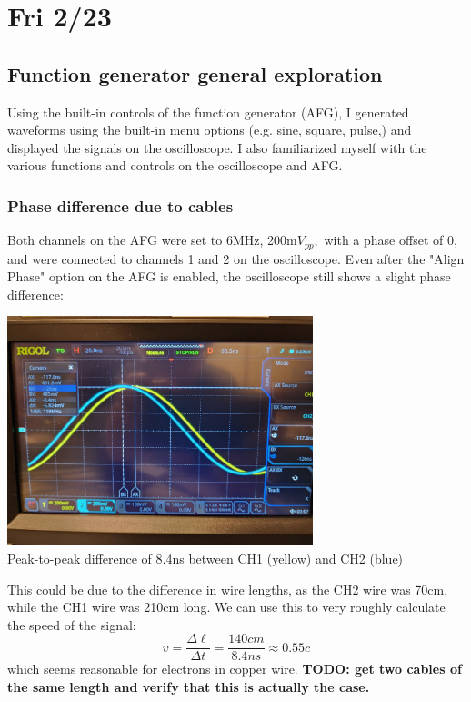 \documentclass{article}
\begin{document}
    \section*{Fri 2/23}
    \subsection*{Function generator general exploration}
    Using the built-in controls of the function generator (AFG), I generated waveforms using the built-in menu options (e.g. sine, square, pulse,) and displayed the signals on the oscilloscope. I also familiarized myself with the various functions and controls on the oscilloscope and AFG.
    \subsubsection*{Phase difference due to cables}
    Both channels on the AFG were set to 6MHz, 200m$V_{pp},$ with a phase offset of $0,$ and were connected to channels 1 and 2 on the oscilloscope. Even after the "Align Phase" option on the AFG is enabled, the oscilloscope still shows a slight phase difference: 
    \begin{mdframed}[backgroundcolor=gray!20, align = center, userdefinedwidth = 3.8in]
    \includegraphics[width = 3.5in]{img/phase_difference.jpg}
    \\Peak-to-peak difference of 8.4ns between CH1 (yellow) and CH2 (blue)
    \end{mdframed}
    This could be due to the difference in wire lengths, as the CH2 wire was 70cm, while the CH1 wire was 210cm long. We can use this to very roughly calculate the speed of the signal:
    $$v = \frac{\Delta \ell}{\Delta t} = \frac{140cm}{8.4ns} \approx 0.55c$$
    which seems reasonable for electrons in copper wire. \textbf{TODO: get two cables of the same length and verify that this is actually the case.}
\end{document}
